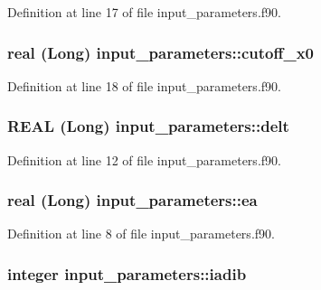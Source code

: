 Definition at line 17 of file input\_\-parameters.f90.

\hypertarget{namespaceinput__parameters_a87f2d307b48a20f985ea0692b9dfebf6}{
\subsubsection[{cutoff\_\-x0}]{\setlength{\rightskip}{0pt plus 5cm}real (Long) {\bf input\_\-parameters::cutoff\_\-x0}}}
\label{namespaceinput__parameters_a87f2d307b48a20f985ea0692b9dfebf6}


Definition at line 18 of file input\_\-parameters.f90.

\hypertarget{namespaceinput__parameters_a42efff37bd453975f48e8485e5757acd}{
\subsubsection[{delt}]{\setlength{\rightskip}{0pt plus 5cm}REAL (Long) {\bf input\_\-parameters::delt}}}
\label{namespaceinput__parameters_a42efff37bd453975f48e8485e5757acd}


Definition at line 12 of file input\_\-parameters.f90.

\hypertarget{namespaceinput__parameters_ac937498371c0568d2d4ed1e1ef034e1d}{
\subsubsection[{ea}]{\setlength{\rightskip}{0pt plus 5cm}real (Long) {\bf input\_\-parameters::ea}}}
\label{namespaceinput__parameters_ac937498371c0568d2d4ed1e1ef034e1d}


Definition at line 8 of file input\_\-parameters.f90.

\hypertarget{namespaceinput__parameters_a2b1e4d8baaa62168d989002cf747b30b}{
\subsubsection[{iadib}]{\setlength{\rightskip}{0pt plus 5cm}integer {\bf input\_\-parameters::iadib}}}
\label{namespaceinput__parameters_a2b1e4d8baaa62168d989002cf747b30b}


